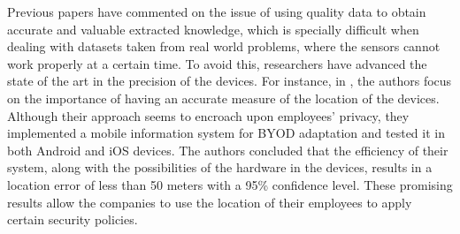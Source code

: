 \documentclass[a4paper,10pt,twocolumn,preprint,3p]{elsarticle}
\begin{document}
Previous papers have commented on the issue of using quality data to obtain accurate and valuable extracted knowledge, which is specially difficult when dealing with datasets taken from real world problems, where the sensors cannot work properly at a certain time. %
To avoid this, researchers have advanced the state of the art in the precision of the
devices. For instance, in \cite{rios2015mobile}, the authors focus on
the importance of having an accurate measure of the location of the
devices. Although their approach seems to encroach upon employees'
privacy, they implemented a mobile information system for BYOD
adaptation and tested it in both Android and iOS devices. The authors
concluded that the efficiency of their system, along with the
possibilities of the hardware in the devices, results in a location
error of less than 50 meters with a 95\% confidence level. These
promising results allow the companies to use the location of their
employees to apply certain security policies.

\end{document}

